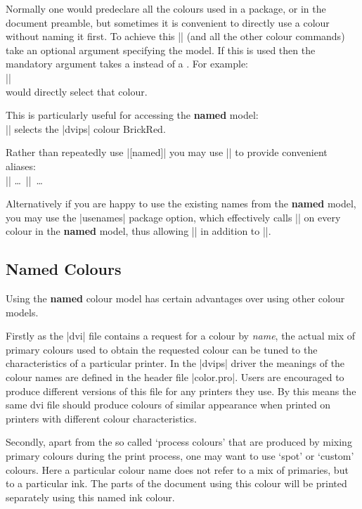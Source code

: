 Normally one would predeclare all the colours used in a package, or in
the document preamble, but sometimes it is convenient to directly use
a colour without naming it first. To achieve this |\color| (and all
the other colour commands) take an optional argument specifying the
model. If this is used then the mandatory argument takes a
 instead of a . For example:\\
|\color[rgb]{1,0.2,0.3}|\\
would directly select that colour.

This is particularly useful for accessing the \textbf{named} model:\\
|\color[named]{BrickRed}| selects the |dvips| colour BrickRed.

Rather than repeatedly use |[named]| you may use |\definecolor| to
provide convenient aliases:\\
||
     \ldots\ |\color{myred}|\ \ldots

Alternatively if you are happy to use the existing names from the
\textbf{named} model, you may use the |usenames| package option, which
effectively calls |\definecolor| on every colour in the \textbf{named}
model, thus allowing |\color{WildStrawberry}| in addition to
|\color[named]{WildStrawbery}|.

\subsection{Named Colours}
Using the \textbf{named} colour model has certain advantages over
using other colour models.

Firstly as the |dvi| file contains a request
for a colour by \emph{name}, the actual mix of primary colours used to
obtain the requested colour can be tuned to the characteristics of a
particular printer. In the |dvips| driver the meanings of the colour
names are defined in the header file |color.pro|. Users are encouraged
to produce different versions of this file for any printers they use. By
this means the same dvi file should produce colours of similar
appearance when printed on printers with different colour
characteristics.

Secondly, apart from the so called `process colours' that are produced
by mixing primary colours during the print process, one may want to use
`spot' or `custom' colours. Here a particular colour name does not
refer to a mix of primaries, but to a particular ink. The parts of the
document using this colour will be printed separately using this named
ink colour.

